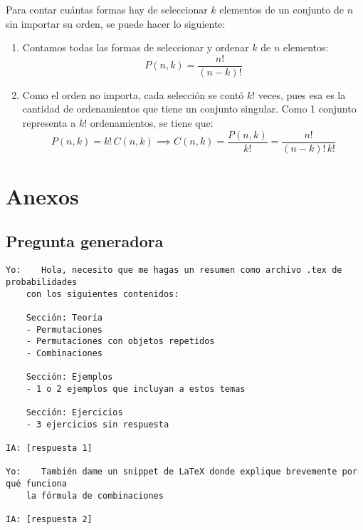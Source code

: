 \documentclass{article}
\begin{document}
Para contar cuántas formas hay de seleccionar $k$ elementos de un conjunto de $n$ sin importar su orden, se puede hacer lo siguiente:

\begin{enumerate}
    \item Contamos todas las formas de seleccionar y ordenar $k$ de $n$ elementos:
    \[
        P(n, k) = \frac{n!}{(n-k)!}
    \]
    \item Como el orden no importa, cada selección se contó $k!$ veces, pues esa es la cantidad de ordenamientos que tiene un conjunto singular. Como 1 conjunto representa a $k!$ ordenamientos, se tiene que:
    \[
        P(n, k) = k! \, C(n, k) \implies C(n, k) = \frac{P(n, k)}{k!} = \frac{n!}{(n-k)! \, k!}
    \]
\end{enumerate}

\section{Anexos}
\subsection{Pregunta generadora}

\begin{verbatim}
Yo:    Hola, necesito que me hagas un resumen como archivo .tex de probabilidades
    con los siguientes contenidos:

    Sección: Teoría
    - Permutaciones
    - Permutaciones con objetos repetidos
    - Combinaciones

    Sección: Ejemplos
    - 1 o 2 ejemplos que incluyan a estos temas

    Sección: Ejercicios
    - 3 ejercicios sin respuesta

IA: [respuesta 1]

Yo:    También dame un snippet de LaTeX donde explique brevemente por qué funciona
    la fórmula de combinaciones

IA: [respuesta 2]
\end{verbatim}
\end{document}
